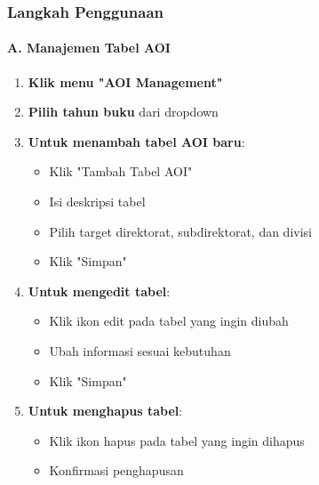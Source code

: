 \documentclass[12pt,a4paper]{article}
\begin{document}
\subsubsection{Langkah Penggunaan}

\paragraph{A. Manajemen Tabel AOI}
\begin{enumerate}
    \item \textbf{Klik menu "AOI Management"}
    \item \textbf{Pilih tahun buku} dari dropdown
    \item \textbf{Untuk menambah tabel AOI baru}:
    \begin{itemize}
        \item Klik "Tambah Tabel AOI"
        \item Isi deskripsi tabel
        \item Pilih target direktorat, subdirektorat, dan divisi
        \item Klik "Simpan"
    \end{itemize}
    \item \textbf{Untuk mengedit tabel}:
    \begin{itemize}
        \item Klik ikon edit pada tabel yang ingin diubah
        \item Ubah informasi sesuai kebutuhan
        \item Klik "Simpan"
    \end{itemize}
    \item \textbf{Untuk menghapus tabel}:
    \begin{itemize}
        \item Klik ikon hapus pada tabel yang ingin dihapus
        \item Konfirmasi penghapusan
    \end{itemize}
\end{enumerate}
\end{document}
